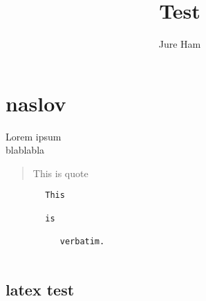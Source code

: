 \documentclass[12pt]{article}
\begin{document}
\title{Test}
\author{Jure Ham}
\maketitle
\section{naslov}
		Lorem ipsum 
\\
blablabla
		
\begin{quote}
			This is quote
		
\end{quote}
\begin{verbatim}
		This
		
		is
		
		   verbatim.
		
\end{verbatim}
		\subsection{latex test}
		
\pagebreak{}
\end{document}
